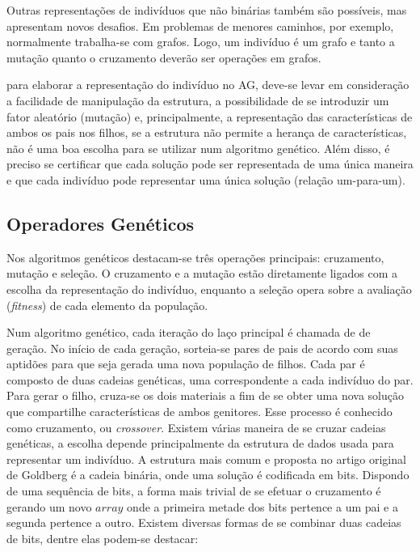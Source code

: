 Outras representações de indivíduos que não binárias também são possíveis, mas apresentam novos desafios. Em problemas de menores caminhos, por exemplo, normalmente trabalha-se com grafos. Logo, um indivíduo é um grafo e tanto a mutação quanto o cruzamento deverão ser operações em grafos.

para elaborar a representação do indivíduo no AG, deve-se levar em consideração a facilidade de manipulação da estrutura, a possibilidade de se introduzir um fator aleatório (mutação) e, principalmente, a representação das características de ambos os pais nos filhos, se a estrutura não permite a herança de características, não é uma boa escolha para se utilizar num algoritmo genético. Além disso, é preciso se certificar que cada solução pode ser representada de uma única maneira e que cada indivíduo pode representar uma única solução (relação um-para-um).

\subsection{Operadores Genéticos}
Nos algoritmos genéticos destacam-se três operações principais: cruzamento, mutação e seleção. O cruzamento e a mutação estão diretamente ligados com a escolha da representação do indivíduo, enquanto a seleção opera sobre a avaliação (\textit{fitness}) de cada elemento da população.

Num algoritmo genético, cada iteração do laço principal é chamada de de geração. No início de cada geração, sorteia-se pares de pais de acordo com suas aptidões para que seja gerada uma nova população de filhos. Cada par é composto de duas cadeias genéticas, uma correspondente a cada indivíduo do par. Para gerar o filho, cruza-se os dois materiais a fim de se obter uma nova solução que compartilhe características de ambos genitores. Esse processo é conhecido como cruzamento, ou \textit{crossover}. Existem várias maneira de se cruzar cadeias genéticas, a escolha depende principalmente da estrutura de dados usada para representar um indivíduo. A estrutura mais comum e proposta no artigo original de Goldberg \cite{Goldberg1989} é a cadeia binária, onde uma solução é codificada em bits. Dispondo de uma sequência de bits, a forma mais trivial de se efetuar o cruzamento é gerando um novo $array$ onde a primeira metade dos bits pertence a um pai e a segunda pertence a outro. Existem diversas formas de se combinar duas cadeias de bits, dentre elas podem-se destacar:

